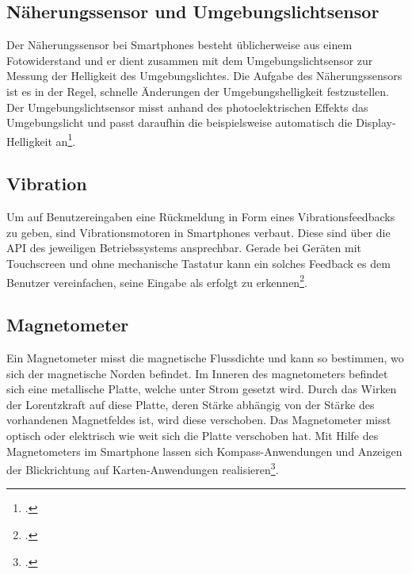 \subsection{Näherungssensor und Umgebungslichtsensor}

Der Näherungssensor bei Smartphones besteht üblicherweise aus einem Fotowiderstand und er dient zusammen mit dem Umgebungslichtsensor zur Messung der Helligkeit des Umgebungslichtes. Die Aufgabe des Näherungssensors ist es in der Regel, schnelle Änderungen der Umgebungshelligkeit festzustellen. Der Umgebungslichtsensor misst anhand des photoelektrischen Effekts das Umgebungslicht und passt daraufhin die beispielsweise automatisch die Display-Helligkeit an\footcite{AndroidWiki}. 

\subsection{Vibration}

Um auf Benutzereingaben eine Rückmeldung in Form eines Vibrationsfeedbacks zu geben, sind Vibrationsmotoren in Smartphones verbaut. Diese sind über die API des jeweiligen Betriebssystems ansprechbar. Gerade bei Geräten mit Touchscreen und ohne mechanische Tastatur kann ein solches Feedback es dem Benutzer vereinfachen, seine Eingabe als erfolgt zu erkennen\footcite{AndroidWiki}. 

\subsection{Magnetometer}

Ein  Magnetometer misst die magnetische Flussdichte und kann so bestimmen, wo sich der magnetische Norden befindet. Im Inneren des magnetometers befindet sich eine metallische Platte, welche unter Strom gesetzt wird. Durch das Wirken der Lorentzkraft auf diese Platte, deren Stärke abhängig von der Stärke des vorhandenen Magnetfeldes ist, wird diese verschoben. Das Magnetometer misst optisch oder elektrisch wie weit sich die Platte verschoben hat. Mit Hilfe des Magnetometers im Smartphone lassen sich Kompass-Anwendungen und Anzeigen der Blickrichtung auf Karten-Anwendungen realisieren\footcite{AndroidMag}. 